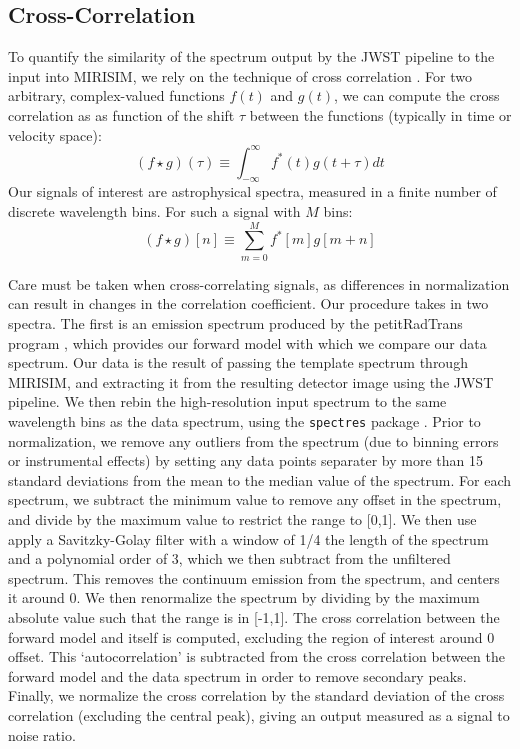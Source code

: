 \subsection{Cross-Correlation}
\cite{Snellen2014}%
\cite{Simkin1974} %
\cite{Tonry1979} %
\cite{Petermann2019} %
\cite{Bodis2007} %
To quantify the similarity of the spectrum output by the JWST pipeline to the input into MIRISIM, we rely on the technique of cross correlation \cite{}.
For two arbitrary, complex-valued functions $f(t)$ and $g(t)$, we can compute the cross correlation as as function of the shift $\tau$ between the functions (typically in time or velocity space):
\begin{equation}\label{eqn:crosscorr}
\left(f \star g\right)(\tau) \equiv \int_{-\infty}^{\infty}f^{*}(t)g(t + \tau)dt
\end{equation}
Our signals of interest are astrophysical spectra, measured in a finite number of discrete wavelength bins. For such a signal with $M$ bins:
\begin{equation}\label{eqn:discretecorr}
\left(f \star g\right)[n] \equiv \sum_{m=0}^{M}f^{*}[m]g[m + n]
\end{equation}

Care must be taken when cross-correlating signals, as differences in normalization can result in changes in the correlation coefficient. 
Our procedure takes in two spectra. 
The first is an emission spectrum produced by the petitRadTrans program \cite{Molliere2019}, which provides our forward model with which we compare our data spectrum.
Our data is the result of passing the template spectrum through MIRISIM, and extracting it from the resulting detector image using the JWST pipeline.
We then rebin the high-resolution input spectrum to the same wavelength bins as the data spectrum, using the \verb|spectres| package \cite{}.
Prior to normalization, we remove any outliers from the spectrum (due to binning errors or instrumental effects) by setting any data points separater by more than 15 standard deviations from the mean to the median value of the spectrum.
For each spectrum, we subtract the minimum value to remove any offset in the spectrum, and divide by the maximum value to restrict the range to [0,1]. 
We then use apply a Savitzky-Golay filter with a window of 1/4 the length of the spectrum and a polynomial order of 3, which we then subtract from the unfiltered spectrum. 
This removes the continuum emission from the spectrum, and centers it around 0.
We then renormalize the spectrum by dividing by the maximum absolute value such that the range is in [-1,1]. 
The cross correlation between the forward model and itself is computed, excluding the region of interest around 0 offset. 
This `autocorrelation' is subtracted from the cross correlation between the forward model and the data spectrum in order to remove secondary peaks.
Finally, we normalize the cross correlation by the standard deviation of the cross correlation (excluding the central peak), giving an output measured as a signal to noise ratio.
